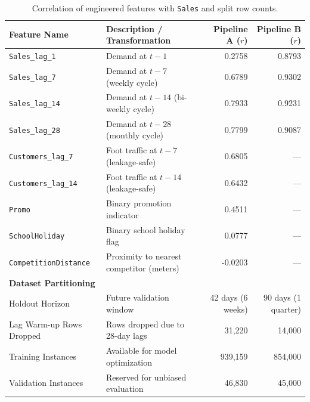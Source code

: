 \documentclass[11pt,a4paper]{article}
\begin{document}
\begin{table}[H]
    \centering
    \small
    \begin{tabular}{llrr}
        \toprule
        \textbf{Feature Name} & \textbf{Description / Transformation} & \textbf{Pipeline A ($r$)} & \textbf{Pipeline B ($r$)} \\
        \midrule
        \texttt{Sales\_lag\_1} & Demand at $t-1$ & 0.2758 & 0.8793 \\
        \texttt{Sales\_lag\_7} & Demand at $t-7$ (weekly cycle) & 0.6789 & 0.9302 \\
        \texttt{Sales\_lag\_14} & Demand at $t-14$ (bi-weekly cycle) & 0.7933 & 0.9231 \\
        \texttt{Sales\_lag\_28} & Demand at $t-28$ (monthly cycle) & 0.7799 & 0.9087 \\
        \texttt{Customers\_lag\_7} & Foot traffic at $t-7$ (leakage-safe) & 0.6805 & --- \\
        \texttt{Customers\_lag\_14} & Foot traffic at $t-14$ (leakage-safe) & 0.6432 & --- \\
        \texttt{Promo} & Binary promotion indicator & 0.4511 & --- \\
        \texttt{SchoolHoliday} & Binary school holiday flag & 0.0777 & --- \\
        \texttt{CompetitionDistance} & Proximity to nearest competitor (meters) & -0.0203 & --- \\
        \midrule
        \textbf{Dataset Partitioning} & & & \\
        Holdout Horizon & Future validation window & 42 days (6 weeks) & 90 days (1 quarter) \\
        Lag Warm-up Rows Dropped & Rows dropped due to 28-day lags & 31,220 & 14,000 \\
        Training Instances & Available for model optimization & 939,159 & 854,000 \\
        Validation Instances & Reserved for unbiased evaluation & 46,830 & 45,000 \\
        \bottomrule
    \end{tabular}
    \caption{Correlation of engineered features with \texttt{Sales} and split row counts.}
    \label{tab:feature_summary}
\end{table}
\end{document}
